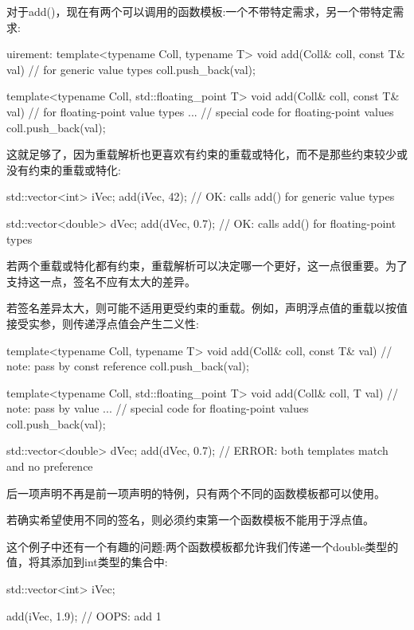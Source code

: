 对于add()，现在有两个可以调用的函数模板:一个不带特定需求，另一个带特定需求:

\begin{cpp}
uirement:
template<typename Coll, typename T>
void add(Coll& coll, const T& val) // for generic value types
{
	coll.push_back(val);
}

template<typename Coll, std::floating_point T>
void add(Coll& coll, const T& val) // for floating-point value types
{
	... // special code for floating-point values
	coll.push_back(val);
}
\end{cpp}

这就足够了，因为重载解析也更喜欢有约束的重载或特化，而不是那些约束较少或没有约束的重载或特化:

\begin{cpp}
std::vector<int> iVec;
add(iVec, 42); // OK: calls add() for generic value types

std::vector<double> dVec;
add(dVec, 0.7); // OK: calls add() for floating-point types
\end{cpp}


若两个重载或特化都有约束，重载解析可以决定哪一个更好，这一点很重要。为了支持这一点，签名不应有太大的差异。

若签名差异太大，则可能不适用更受约束的重载。例如，声明浮点值的重载以按值接受实参，则传递浮点值会产生二义性:

\begin{cpp}
template<typename Coll, typename T>
void add(Coll& coll, const T& val) // note: pass by const reference
{
	coll.push_back(val);
}

template<typename Coll, std::floating_point T>
void add(Coll& coll, T val) // note: pass by value
{
	... // special code for floating-point values
	coll.push_back(val);
}

std::vector<double> dVec;
add(dVec, 0.7); // ERROR: both templates match and no preference
\end{cpp}

后一项声明不再是前一项声明的特例，只有两个不同的函数模板都可以使用。

若确实希望使用不同的签名，则必须约束第一个函数模板不能用于浮点值。


这个例子中还有一个有趣的问题:两个函数模板都允许我们传递一个double类型的值，将其添加到int类型的集合中:

\begin{cpp}
std::vector<int> iVec;

add(iVec, 1.9); // OOPS: add 1
\end{cpp}

